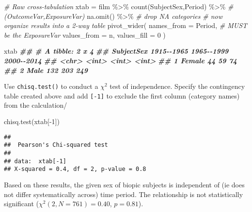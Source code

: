 \documentclass[
  12pt,
]{krantz}
\newenvironment{Shaded}{\begin{snugshade}}{\end{snugshade}}
\newcommand{\AttributeTok}[1]{\textcolor[rgb]{0.77,0.63,0.00}{#1}}
\newcommand{\CommentTok}[1]{\textcolor[rgb]{0.56,0.35,0.01}{\textit{#1}}}
\newcommand{\DecValTok}[1]{\textcolor[rgb]{0.00,0.00,0.81}{#1}}
\newcommand{\DocumentationTok}[1]{\textcolor[rgb]{0.56,0.35,0.01}{\textbf{\textit{#1}}}}
\newcommand{\FunctionTok}[1]{\textcolor[rgb]{0.00,0.00,0.00}{#1}}
\newcommand{\NormalTok}[1]{#1}
\newcommand{\OtherTok}[1]{\textcolor[rgb]{0.56,0.35,0.01}{#1}}
\newcommand{\SpecialCharTok}[1]{\textcolor[rgb]{0.00,0.00,0.00}{#1}}
\begin{document}
\begin{Shaded}
\begin{Highlighting}[]
\CommentTok{\# Raw cross{-}tabulation}
\NormalTok{  xtab }\OtherTok{=}
\NormalTok{    film }\SpecialCharTok{\%\textgreater{}\%} 
    \FunctionTok{count}\NormalTok{(SubjectSex,Period) }\SpecialCharTok{\%\textgreater{}\%}  \CommentTok{\# (OutcomeVar,ExposureVar)}
    \FunctionTok{na.omit}\NormalTok{() }\SpecialCharTok{\%\textgreater{}\%} \CommentTok{\# drop NA categories}
  \CommentTok{\# now organize results into a 2{-}way table}
    \FunctionTok{pivot\_wider}\NormalTok{(}
      \AttributeTok{names\_from =}\NormalTok{ Period, }\CommentTok{\# MUST be the ExposureVar}
      \AttributeTok{values\_from =}\NormalTok{ n, }
      \AttributeTok{values\_fill =} \DecValTok{0}
\NormalTok{    )}

\NormalTok{  xtab}
\DocumentationTok{\#\# \# A tibble: 2 x 4}
\DocumentationTok{\#\#   SubjectSex \textasciigrave{}1915{-}{-}1965\textasciigrave{} \textasciigrave{}1965{-}{-}1999\textasciigrave{} \textasciigrave{}2000{-}{-}2014\textasciigrave{}}
\DocumentationTok{\#\#   \textless{}chr\textgreater{}             \textless{}int\textgreater{}        \textless{}int\textgreater{}        \textless{}int\textgreater{}}
\DocumentationTok{\#\# 1 Female               44           59           74}
\DocumentationTok{\#\# 2 Male                132          203          249}
\end{Highlighting}
\end{Shaded}

Use \texttt{chisq.test()} to conduct a \(\chi^2\) test of independence. Specify the contingency table created above and add \texttt{{[}-1{]}} to exclude the first column (category names) from the calculation/

\begin{Shaded}
\begin{Highlighting}[]
  \FunctionTok{chisq.test}\NormalTok{(xtab[}\SpecialCharTok{{-}}\DecValTok{1}\NormalTok{])}
\end{Highlighting}
\end{Shaded}

\begin{verbatim}
## 
##  Pearson's Chi-squared test
## 
## data:  xtab[-1]
## X-squared = 0.4, df = 2, p-value = 0.8
\end{verbatim}

Based on these results, the given sex of biopic subjects is independent of (ie does not differ systematically across) time period. The relationship is not statistically significant (\(\chi^2(2,N=761)=0.40\), \(p=0.81\)).
\end{document}
